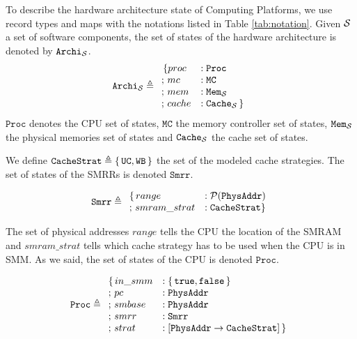 To describe the hardware architecture state of  Computing
Platforms, we use record types and maps with the notations listed in Table
\ref{tab:notation}.  Given $\mathcal{S}$ a set of software components, the set of
states of the hardware architecture is denoted by $\texttt{Archi}_{\mathcal{S}}$.
\[ \texttt{Archi}_{\mathcal{S}} \triangleq
  \begin{array}{ll}
    \,\{proc &: \texttt{Proc}          \\
    ;\,mc    &: \texttt{MC}            \\
    ;\,mem   &: \texttt{Mem}_{\mathcal{S}} \\
    ;\,cache &: \texttt{Cache}_{\mathcal{S}}\,\}
  \end{array}
\]
$\texttt{Proc}$ denotes the CPU set of states, $\texttt{MC}$ the memory
controller set of states, $\texttt{Mem}_{\mathcal{S}}$ the physical memories set of
states and $\texttt{Cache}_{\mathcal{S}}$ the cache set of states.

We define $\texttt{CacheStrat} \triangleq \{\,\mathtt{UC}, \mathtt{WB}\,\}$ the
set of the modeled cache strategies. The set of states of the SMRRs is denoted
$\texttt{Smrr}$.

\[ \texttt{Smrr} \triangleq \begin{array}{ll}
                              \{\,range &: \mathcal{P}(\texttt{PhysAddr}) \\
                               ;\,smram\_strat &: \texttt{CacheStrat} \}
\end{array} \]

The set of physical addresses $range$ tells the CPU the location of the SMRAM
and $smram\_strat$ tells which cache strategy has to be used when the CPU is in
SMM. As we said, the set of states of the CPU is denoted $\texttt{Proc}$.

\[ \texttt{Proc} \triangleq \begin{array}{ll}
                              \{\,in\_smm &: \{\,\mathtt{true},
                              \mathtt{false}\,\} \\
                              ;\,pc &: \texttt{PhysAddr} \\
                              ;\,smbase &: \texttt{PhysAddr} \\
                              ;\,smrr &: \texttt{Smrr} \\
                              ;\,strat &: [ \texttt{PhysAddr} \rightarrow
                              \texttt{CacheStrat}]\,\}
                            \end{array} \]

